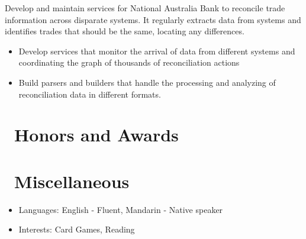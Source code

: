 \documentclass{resume}
\begin{document}
\begin{flushleft}
Develop and maintain services for National Australia Bank to reconcile trade information across disparate systems. It regularly extracts data from systems and identifies trades that should be the same, locating any differences.
\begin{itemize}
  \item Develop services that monitor the arrival of data from different systems and coordinating the graph of thousands of reconciliation actions
  \item Build parsers and builders that handle the processing and analyzing of reconciliation data in different formats.
\end{itemize}
\end{flushleft}

\section{\faHeartO\ Honors and Awards}

\section{\faInfo\ Miscellaneous}
\begin{itemize}[parsep=0.5ex]
  \item Languages: English - Fluent, Mandarin - Native speaker
  \item Interests: Card Games, Reading
\end{itemize}
\end{document}
